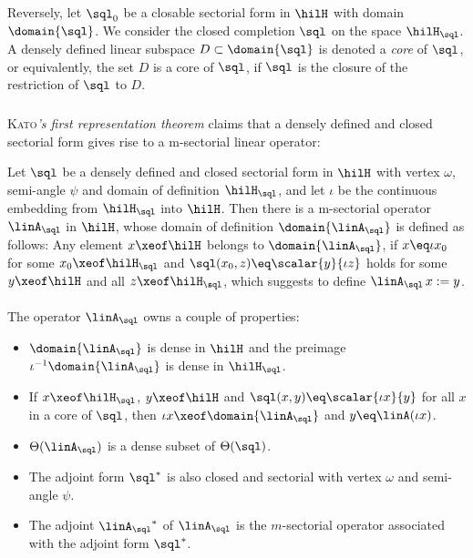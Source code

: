 \documentclass[11pt,twoside]{article}
\begin{document}
\subparagraph{}
Reversely,
let $\sql_0$ be a closable sectorial form in $\hilH$
with domain $\domain{\sql}$.
We consider the closed completion $\sql$ on the space $\hilH_{\sql}$.
A densely defined linear subspace $D \subset \domain{\sql}$ is denoted
a \textit{core} of $\sql$,
or equivalently,
the set $D$ is a core of $\sql$,
if $\sql$ is the closure of the restriction of $\sql$ to $D$.

\subparagraph{}
\textsc{Kato}\textit{'s first representation theorem} claims that
a densely defined and closed sectorial form gives rise
to a m-sectorial linear operator:

\begin{theorem1}\label{FIRST_REPRESENTATION_THEOREM}
Let $\sql$ be a densely defined and closed sectorial form in $\hilH$
with vertex $\omega$, semi-angle $\psi$ and domain of definition $\hilH_{\sql}$,
and let $\iota$ be the continuous embedding from $\hilH_{\sql}$ into $\hilH$.
Then there is a m-sectorial operator $\linA_{\sql}$ in $\hilH$,
whose domain of definition $\domain{\linA_{\sql}}$ is defined as follows:
Any element $x \xeof \hilH$ belongs to $\domain{\linA_{\sql}}$,
if $x \eq \iota x_0$ for some $x_0 \xeof \hilH_{\sql}$ and
$\sql(x_0,z) \eq \scalar{y}{\iota z}$ holds
for some $y \xeof \hilH$ and all $z \xeof \hilH_{\sql}$,
which suggests to define $\linA_{\sql} \, x := y$.

\paragraph{}
The operator $\linA_{\sql}$ owns a couple of properties:

\begin{itemize}[leftmargin=12pt]
\item[(a)]
$\domain{\linA_{\sql}}$ is dense in $\hilH$
and the preimage $\iota^{-1} \domain{\linA_{\sql}}$
is dense in $\hilH_{\sql}$.

\item[(b)]
If $x \xeof \hilH_{\sql}$, $y \xeof \hilH$
and $\sql(x,y) \eq \scalar{\iota x}{y}$ for all $x$ in a core of $\sql$,
then $\iota x \xeof \domain{\linA_{\sql}}$ and $y \eq \linA (\iota x)$.

\item[(c)]
$\Theta(\linA_{\sql})$ is a dense subset of $\Theta(\sql)$.

\item[(d)]
The adjoint form $\sql^*$ is also closed and sectorial
with vertex $\omega$ and semi-angle $\psi$.

\item[(e)]
The adjoint ${\linA_{\sql}}^*$ of $\linA_{\sql}$
is the $m$-sectorial operator associated with the adjoint form $\sql^*$.
\end{itemize}
\end{theorem1}
\end{document}
